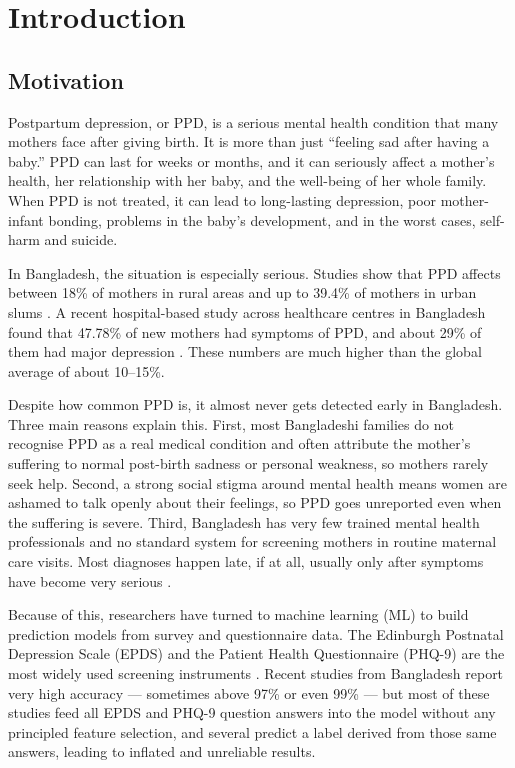 \chapter{Introduction}
\label{ch:introduction}

\section{Motivation}

Postpartum depression, or PPD, is a serious mental health condition that many mothers face after giving birth. It is more than just ``feeling sad after having a baby.'' PPD can last for weeks or months, and it can seriously affect a mother's health, her relationship with her baby, and the well-being of her whole family. When PPD is not treated, it can lead to long-lasting depression, poor mother-infant bonding, problems in the baby's development, and in the worst cases, self-harm and suicide.

In Bangladesh, the situation is especially serious. Studies show that PPD affects between 18\% of mothers in rural areas and up to 39.4\% of mothers in urban slums \cite{azad2019economic}. A recent hospital-based study across healthcare centres in Bangladesh found that 47.78\% of new mothers had symptoms of PPD, and about 29\% of them had major depression \cite{shirin2024burden}. These numbers are much higher than the global average of about 10--15\%.

Despite how common PPD is, it almost never gets detected early in Bangladesh. Three main reasons explain this. First, most Bangladeshi families do not recognise PPD as a real medical condition and often attribute the mother's suffering to normal post-birth sadness or personal weakness, so mothers rarely seek help. Second, a strong social stigma around mental health means women are ashamed to talk openly about their feelings, so PPD goes unreported even when the suffering is severe. Third, Bangladesh has very few trained mental health professionals and no standard system for screening mothers in routine maternal care visits. Most diagnoses happen late, if at all, usually only after symptoms have become very serious \cite{shirin2024burden}.

Because of this, researchers have turned to machine learning (ML) to build prediction models from survey and questionnaire data. The Edinburgh Postnatal Depression Scale (EPDS) and the Patient Health Questionnaire (PHQ-9) are the most widely used screening instruments \cite{cox1987edinburgh, kroenke2001phq}. Recent studies from Bangladesh report very high accuracy --- sometimes above 97\% or even 99\% --- but most of these studies feed all EPDS and PHQ-9 question answers into the model without any principled feature selection, and several predict a label derived from those same answers, leading to inflated and unreliable results.

